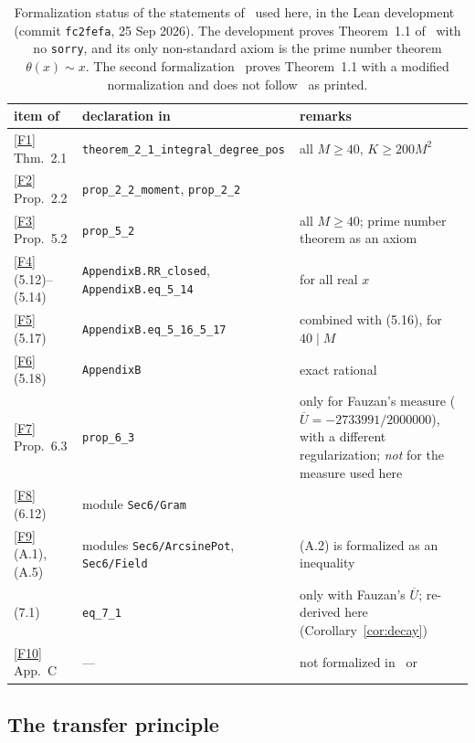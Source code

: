 \documentclass[11pt]{article}
\theoremstyle{remark}
\newcommand{\Ubar}{\overline{U}}
\newcommand{\file}[1]{\texttt{#1}}
\begin{document}
\begin{table}[ht]
\centering
\small
\begin{tabular}{>{\raggedright}p{3.2cm}>{\raggedright}p{5.6cm}>{\raggedright\arraybackslash}p{6.0cm}}
\toprule
item of~\cite{F} & declaration in~\cite{DR} & remarks\\
\midrule
\ref{F1} Thm.~2.1 & \file{theorem\_2\_1\_integral\_degree\_pos} & all $M\ge40$, $K\ge200M^2$\\
\ref{F2} Prop.~2.2 & \file{prop\_2\_2\_moment}, \file{prop\_2\_2} & \\
\ref{F3} Prop.~5.2 & \file{prop\_5\_2} & all $M\ge40$; prime number theorem as an axiom\\
\ref{F4} (5.12)--(5.14) & \file{AppendixB.RR\_closed}, \file{AppendixB.eq\_5\_14} & for all real $x$\\
\ref{F5} (5.17) & \file{AppendixB.eq\_5\_16\_5\_17} & combined with (5.16), for $40\mid M$\\
\ref{F6} (5.18) & \file{AppendixB} & exact rational\\
\ref{F7} Prop.~6.3 & \file{prop\_6\_3} & only for Fauzan's measure ($\Ubar=-2733991/2000000$), with a different regularization; \emph{not} for the measure used here\\
\ref{F8} (6.12) & module \file{Sec6/Gram} & \\
\ref{F9} (A.1), (A.5) & modules \file{Sec6/ArcsinePot}, \file{Sec6/Field} & (A.2) is formalized as an inequality\\
(7.1) & \file{eq\_7\_1} & only with Fauzan's $\Ubar$; re-derived here (Corollary~\ref{cor:decay})\\
\ref{F10} App.~C & --- & not formalized in~\cite{DR} or~\cite{Mo}\\
\bottomrule
\end{tabular}
\caption{Formalization status of the statements of~\cite{F} used here, in the Lean development~\cite{DR} (commit \file{fc2fefa}, 25 Sep 2026). The development proves Theorem~1.1 of~\cite{F} with no \file{sorry}, and its only non-standard axiom is the prime number theorem $\theta(x)\sim x$. The second formalization~\cite{Mo} proves Theorem~1.1 with a modified normalization and does not follow~\cite[(5.11)]{F} as printed.}
\label{tab:lean}
\end{table}

\subsection{The transfer principle}
\end{document}
